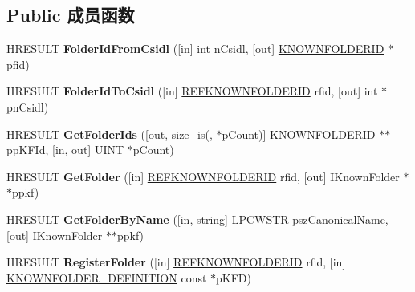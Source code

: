 \subsection*{Public 成员函数}
\begin{DoxyCompactItemize}
\item 
\mbox{\label{interface_i_known_folder_manager_ac484f05b087f88d3b02dd7ce76624bc6}} 
H\+R\+E\+S\+U\+LT {\bfseries Folder\+Id\+From\+Csidl} (\mbox{[}in\mbox{]} int n\+Csidl, \mbox{[}out\mbox{]} \hyperlink{interface_g_u_i_d}{K\+N\+O\+W\+N\+F\+O\+L\+D\+E\+R\+ID} $\ast$pfid)
\item 
\mbox{\label{interface_i_known_folder_manager_a1bdabf80f81e53407f644be44af6126b}} 
H\+R\+E\+S\+U\+LT {\bfseries Folder\+Id\+To\+Csidl} (\mbox{[}in\mbox{]} \hyperlink{interface_g_u_i_d}{R\+E\+F\+K\+N\+O\+W\+N\+F\+O\+L\+D\+E\+R\+ID} rfid, \mbox{[}out\mbox{]} int $\ast$pn\+Csidl)
\item 
\mbox{\label{interface_i_known_folder_manager_ad78b0ac9222f0a396fd39cbd1858f040}} 
H\+R\+E\+S\+U\+LT {\bfseries Get\+Folder\+Ids} (\mbox{[}out, size\+\_\+is(, $\ast$p\+Count)\mbox{]} \hyperlink{interface_g_u_i_d}{K\+N\+O\+W\+N\+F\+O\+L\+D\+E\+R\+ID} $\ast$$\ast$pp\+K\+F\+Id, \mbox{[}in, out\mbox{]} U\+I\+NT $\ast$p\+Count)
\item 
\mbox{\label{interface_i_known_folder_manager_ad2570f0f423d7427ce526008c8137568}} 
H\+R\+E\+S\+U\+LT {\bfseries Get\+Folder} (\mbox{[}in\mbox{]} \hyperlink{interface_g_u_i_d}{R\+E\+F\+K\+N\+O\+W\+N\+F\+O\+L\+D\+E\+R\+ID} rfid, \mbox{[}out\mbox{]} I\+Known\+Folder $\ast$$\ast$ppkf)
\item 
\mbox{\label{interface_i_known_folder_manager_a34ab7ba4c796116008b49511fd0783c6}} 
H\+R\+E\+S\+U\+LT {\bfseries Get\+Folder\+By\+Name} (\mbox{[}in, \hyperlink{structstring}{string}\mbox{]} L\+P\+C\+W\+S\+TR psz\+Canonical\+Name, \mbox{[}out\mbox{]} I\+Known\+Folder $\ast$$\ast$ppkf)
\item 
\mbox{\label{interface_i_known_folder_manager_a57ae85f5d3a2a88e8e64048fae8b66de}} 
H\+R\+E\+S\+U\+LT {\bfseries Register\+Folder} (\mbox{[}in\mbox{]} \hyperlink{interface_g_u_i_d}{R\+E\+F\+K\+N\+O\+W\+N\+F\+O\+L\+D\+E\+R\+ID} rfid, \mbox{[}in\mbox{]} \hyperlink{structtag_k_n_o_w_n_f_o_l_d_e_r___d_e_f_i_n_i_t_i_o_n}{K\+N\+O\+W\+N\+F\+O\+L\+D\+E\+R\+\_\+\+D\+E\+F\+I\+N\+I\+T\+I\+ON} const $\ast$p\+K\+FD)
$$
\end{DoxyCompactItemize}
